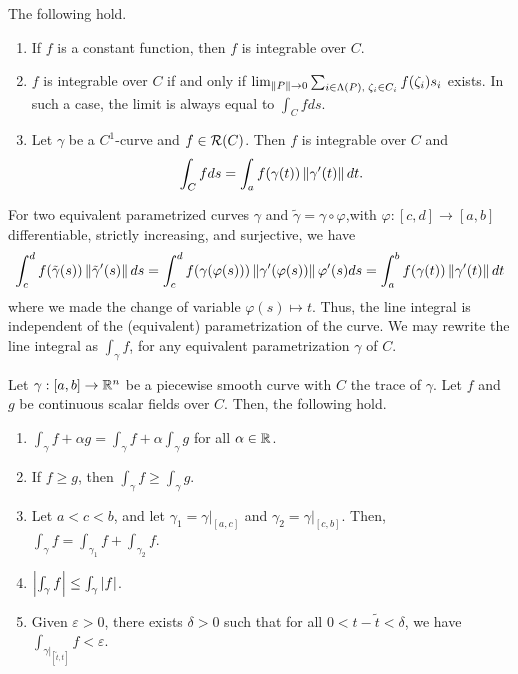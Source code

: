 \begin{theorem}
    The following hold.
    \begin{enumerate}
        \item If $f$ is a constant function, then $f$ is integrable over $C$.
        \item $f$ is integrable over $C$ if and only if $\lim_{\left\lVert P\right\rVert \to 0} \sum_{i \in \Lambda(P),\;\zeta_{i} \in C_{i}} f(\zeta_{i}) s_{i}$ exists. In such a case, the limit is always equal to $\int_{C} f ds$.
        \item Let $\gamma$ be a $C^{1}$-curve and $f \in \mathcal{R}(C)$. Then $f$ is integrable over $C$ and
        \begin{align}
            \int_{C} f ds = \int_{a}^{} f(\gamma(t)) \left\lVert\gamma'(t)\right\rVert dt.
        \end{align}
    \end{enumerate}
\end{theorem}

For two equivalent parametrized curves $\gamma$ and $\tilde{\gamma} = \gamma \circ \varphi$,with $\varphi:[c,d] \to [a,b]$ differentiable, strictly increasing, and surjective, we have
\begin{align}
    \int_{c}^{d} f(\tilde{\gamma}(s)) \left\lVert\tilde{\gamma}'(s)\right\rVert ds = \int_{c}^{d} f(\gamma(\varphi(s))) \left\lVert\gamma'(\varphi(s))\right\rVert \varphi'(s) ds = \int_{a}^{b} f(\gamma(t)) \left\lVert\gamma'(t)\right\rVert dt
\end{align}
where we made the change of variable $\varphi(s) \mapsto t$. Thus, the line integral is independent of the (equivalent) parametrization of the curve. We may rewrite the line integral as $\int_{\gamma} f$, for any equivalent parametrization $\gamma$ of $C$.

Let $\gamma:[a,b] \to \mathbb{R}^{n}$ be a piecewise smooth curve with $C$ the trace of $\gamma$. Let $f$ and $g$ be continuous scalar fields over $C$. Then, the following hold.
\begin{enumerate}
    \item $\int_{\gamma} f + \alpha g = \int_{\gamma} f + \alpha \int_{\gamma} g$ for all $\alpha \in \mathbb{R}$.
    \item If $f \geq g$, then $\int_{\gamma} f \geq \int_{\gamma} g$.
    \item Let $a < c < b$, and let $\gamma_{1} = \gamma|_{[a,c]}$ and $\gamma_{2} = \gamma|_{[c,b]}$. Then, $\int_{\gamma} f = \int_{\gamma_{1}} f + \int_{\gamma_{2}} f$.
    \item $\left| \int_{\gamma} f \right| \leq \int_{\gamma} \left| f \right|$.
    \item Given $\varepsilon > 0$, there exists $\delta > 0$ such that for all $0 < t - \tilde{t} < \delta$, we have $\int_{\gamma|_{[\tilde{t},t]}} f < \varepsilon$.
\end{enumerate}

